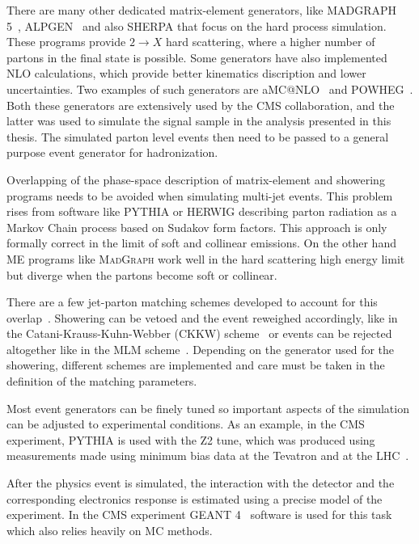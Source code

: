 There are many other dedicated matrix-element generators, like \textsc{MADGRAPH 5}~\cite{ARTICLE:MadGraph5}, \textsc{ALPGEN}~\cite{ARTICLE:ALPGENGenerator} and also \textsc{SHERPA} that focus on the hard process simulation. These programs provide $2 \rightarrow X$ hard scattering, where a higher number of partons in the final state is possible. Some generators have also implemented \gls{NLO} calculations, which provide better kinematics discription and lower uncertainties. Two examples of such generators are a\textsc{MC@NLO}~\cite{ARTICLE:aMCatNLO} and \textsc{POWHEG}~\cite{ARTICLE:POWHEG_2004,ARTICLE:POWHEG_2007,ARTICLE:POWHEG_2009v1,ARTICLE:POWHEG_2009v2,ARTICLE:POWHEG_2010v1,ARTICLE:POWHEG_2010v2,ARTICLE:POWHEG_2011v1,ARTICLE:POWHEG_2011v2}. Both these generators are extensively used by the \gls{CMS} collaboration, and the latter was used to simulate the signal sample in the analysis presented in this thesis. The simulated parton level events then need to be passed to a general purpose event generator for hadronization. 

Overlapping of the phase-space description of matrix-element and showering programs needs to be avoided when simulating multi-jet events. This problem rises from software like \textsc{PYTHIA} or \textsc{HERWIG} describing parton radiation as a Markov Chain process based on Sudakov form factors. This approach is only formally correct in the limit of soft and collinear emissions. On the other hand \gls{ME} programs like \textsc{MadGraph} work well in the hard scattering high energy limit but diverge when the partons become soft or collinear. 

There are a few jet-parton matching schemes developed to account for this overlap~\cite{ARTICLE:MatchingPartonShowersAndMatrixElements}. Showering can be vetoed and the event reweighed accordingly, like in the Catani-Krauss-Kuhn-Webber (CKKW) scheme~\cite{ARTICLE:CKKWSchemeRef1,ARTICLE:CKKWSchemeRef2,ARTICLE:CKKWSchemeRef3} or events can be rejected altogether like in the MLM scheme~\cite{ARTICLE:MLMScheme}. Depending on the generator used for the showering, different schemes are implemented and care must be taken in the definition of the matching parameters.

Most event generators can be finely tuned so important aspects of the simulation can be adjusted to experimental conditions. As an example, in the \gls{CMS} experiment, \textsc{PYTHIA} is used with the Z2 tune, which was produced using measurements made using minimum bias data at the Tevatron and at the \gls{LHC}~\cite{ARTICLE:CMSMeasurementUnderlyingEventActivity}.  

After the physics event is simulated, the interaction with the detector and the corresponding electronics response is estimated using a precise model of the experiment. In the \gls{CMS} experiment \textsc{GEANT 4}~\cite{ARTICLE:GEANT4ASimulationToolkit,ARTICLE:Geant4DevelopmentsAndApplications} software is used for this task which also relies heavily on \gls{MC} methods.




